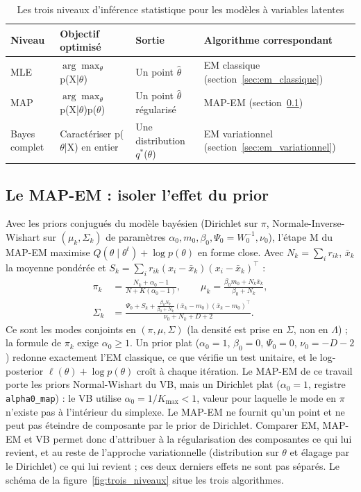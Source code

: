 \begin{table}[H]
\centering
\small
\setlength{\tabcolsep}{0.14cm}
\begin{tabular}{|p{3.54cm}|p{3.54cm}|p{3.54cm}|p{3.54cm}|}
\hline
\textbf{Niveau} & \textbf{Objectif optimisé} & \textbf{Sortie} & \textbf{Algorithme correspondant} \\
\hline
MLE & $\arg\max_{\theta}$ p(X|$\theta $) & Un point $\hat{\theta }$ & EM classique (section~\ref{sec:em_classique}) \\
\hline
MAP & $\arg\max_{\theta}$ p(X|$\theta $)p($\theta $) & Un point $\hat{\theta }$ régularisé & MAP-EM (section~\ref{sec:le_map_em_isoler_l}) \\
\hline
Bayes complet & Caractériser p($\theta $|X) en entier & Une distribution $q^{*}$($\theta $) & EM variationnel (section~\ref{sec:em_variationnel}) \\
\hline
\end{tabular}
\caption{Les trois niveaux d'inférence statistique pour les modèles à variables latentes}
\label{tab:2_2}
\end{table}
\subsection{Le MAP-EM : isoler l'effet du prior}\label{sec:le_map_em_isoler_l}
Avec les priors conjugués du modèle bayésien (Dirichlet sur $\pi$, Normale-Inverse-Wishart sur $(\mu_k, \Sigma_k)$ de paramètres $\alpha_0, m_0, \beta_0, \Psi_0 = W_0^{-1}, \nu_0$), l'étape M du MAP-EM maximise $Q(\theta \mid \theta^t) + \log p(\theta)$ en forme close. Avec $N_k = \sum_i r_{ik}$, $\bar x_k$ la moyenne pondérée et $S_k = \sum_i r_{ik}(x_i - \bar x_k)(x_i - \bar x_k)^\top$ :
\begin{align*}
\pi_k &= \frac{N_k + \alpha_0 - 1}{N + K(\alpha_0 - 1)}, \qquad \mu_k = \frac{\beta_0 m_0 + N_k \bar x_k}{\beta_0 + N_k},\\
\Sigma_k &= \frac{\Psi_0 + S_k + \frac{\beta_0 N_k}{\beta_0 + N_k}(\bar x_k - m_0)(\bar x_k - m_0)^\top}{\nu_0 + N_k + D + 2}.
\end{align*}
Ce sont les modes conjoints en $(\pi, \mu, \Sigma)$ (la densité est prise en $\Sigma$, non en $\Lambda$) ; la formule de $\pi_k$ exige $\alpha_0 \geq 1$. Un prior plat ($\alpha_0 = 1$, $\beta_0 = 0$, $\Psi_0 = 0$, $\nu_0 = -D-2$) redonne exactement l'EM classique, ce que vérifie un test unitaire, et le log-posterior $\ell(\theta) + \log p(\theta)$ croît à chaque itération. Le MAP-EM de ce travail porte les priors Normal-Wishart du VB, mais un Dirichlet plat ($\alpha_0 = 1$, registre \texttt{alpha0\_map}) : le VB utilise $\alpha_0 = 1/K_{\max} < 1$, valeur pour laquelle le mode en $\pi$ n'existe pas à l'intérieur du simplexe. Le MAP-EM ne fournit qu'un point et ne peut pas éteindre de composante par le prior de Dirichlet. Comparer EM, MAP-EM et VB permet donc d'attribuer à la régularisation des composantes ce qui lui revient, et au reste de l'approche variationnelle (distribution sur $\theta$ et élagage par le Dirichlet) ce qui lui revient ; ces deux derniers effets ne sont pas séparés. Le schéma de la figure~\ref{fig:trois_niveaux} situe les trois algorithmes.

